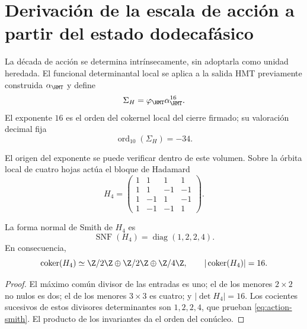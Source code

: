 \label{ch:vacuum}

\section{Derivaci\'on de la escala de acci\'on a partir del estado dodecaf\'asico}

La d\'ecada de acci\'on se determina intr\'insecamente, sin adoptarla como
unidad heredada. El funcional determinantal local se aplica a la salida HMT
previamente construida \(\alpha_{\HMT}\) y define
\begin{equation}
\Sigma_H=\varphi_{\HMT}\alpha_{\HMT}^{16}.
\label{eq:action-determinantal-reader}
\end{equation}
El exponente \(16\) es el orden del cokernel local del cierre firmado; su valoraci\'on decimal fija
\begin{equation}
\operatorname{ord}_{10}(\Sigma_H)=-34.
\label{eq:action-decade}
\end{equation}

El origen del exponente se puede verificar dentro de este volumen. Sobre la
\'orbita local de cuatro hojas act\'ua el bloque de Hadamard
\begin{equation}
H_4=
\begin{pmatrix}
1&1&1&1\\
1&1&-1&-1\\
1&-1&1&-1\\
1&-1&-1&1
\end{pmatrix}.
\label{eq:action-hadamard}
\end{equation}

\begin{lemma}
La forma normal de Smith de \(H_4\) es
\begin{equation}
\operatorname{SNF}(H_4)=\operatorname{diag}(1,2,2,4).
\label{eq:action-smith}
\end{equation}
En consecuencia,
\[
\operatorname{coker}(H_4)\simeq
\Z/2\Z\oplus\Z/2\Z\oplus\Z/4\Z,
\qquad
|\operatorname{coker}(H_4)|=16.
\]
\end{lemma}

\begin{proof}
El m\'aximo com\'un divisor de las entradas es uno; el de los menores
\(2\times2\) no nulos es dos; el de los menores \(3\times3\) es cuatro; y
\(|\det H_4|=16\). Los cocientes sucesivos de estos divisores determinantes
son \(1,2,2,4\), que prueban \cref{eq:action-smith}. El producto de los
invariantes da el orden del con\'ucleo.
\end{proof}

